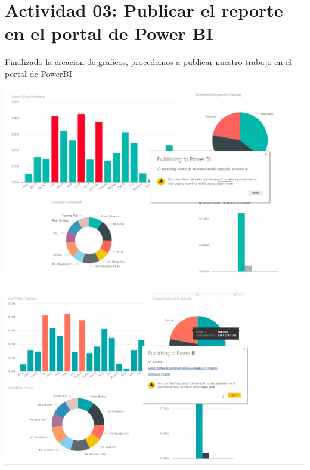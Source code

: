 \section{Actividad 03: Publicar el reporte en el portal de Power BI} 

Finalizado la creacion de graficos, procedemos a publicar nuestro trabajo en el portal de PowerBI

	\begin{center}
	\includegraphics[width=17cm]{./Imagenes/imagen6}
	\end{center}	

	\begin{center}
	\includegraphics[width=17cm]{./Imagenes/imagen7}
	\end{center}	